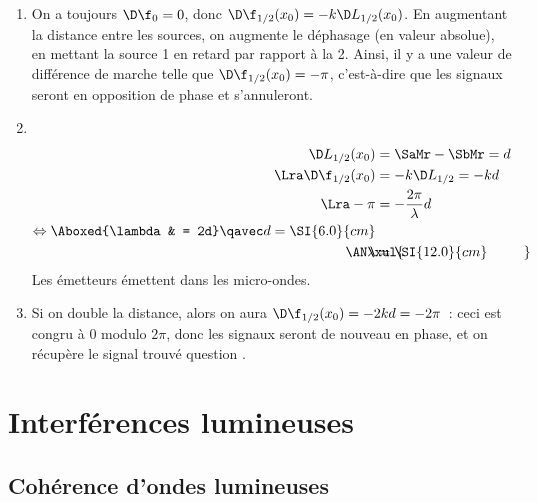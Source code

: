 \documentclass[../../main/main.tex]{subfiles}
\begin{document}
\begin{tcb*}[breakable]
{\begin{enumerate}[label=\sqenumi]
			\item On a toujours $\D\f_0 = 0$, donc $\D\f_{1/2}(x_0) = -k\D
				      L_{1/2}(x_0)$. En augmentant la distance entre les sources, on
			      augmente le déphasage (en valeur absolue), en mettant la source 1 en
			      retard par rapport à la 2. Ainsi, il y a une valeur de différence de
			      marche telle que $\D\f_{1/2}(x_0) = -\pi$, c'est-à-dire que les
			      signaux seront en opposition de phase et s'annuleront.
			\item ~
			      \vspace{-24pt}
			      \begin{align*}
				      \D L_{1/2}(x_0) & = \SaMr - \SbMr = d
				      \\ \Lra
				      \D\f_{1/2}(x_0) & = -k\D L_{1/2} = -kd
				      \\ \Lra
				      -\pi            & = - \frac{2\pi}{\lambda}d \\
				      \Leftrightarrow
				      \Aboxed{\lambda & = 2d}
				      \qavec
				      d = \SI{6.0}{cm}
				      \\
				      \AN
				      \makebox[0pt][l]{$\xul{\phantom{\lambda = \SI{12.0}{cm}}}$}
				      \lambda         & = \SI{12.0}{cm}
			      \end{align*}
			      Les émetteurs émettent dans les micro-ondes.
			\item Si on double la distance, alors on aura $\D\f_{1/2}(x_0) = -2kd =
				      -2\pi$~: ceci est congru à 0 modulo $2\pi$, donc les signaux
			      seront de nouveau en phase, et on récupère le signal trouvé
			      question
			      .
		\end{enumerate}
	}
	\vspace{-15pt}
\end{tcb*}

\section{Interférences lumineuses}
\subsection{Cohérence d'ondes lumineuses}
\end{document}
